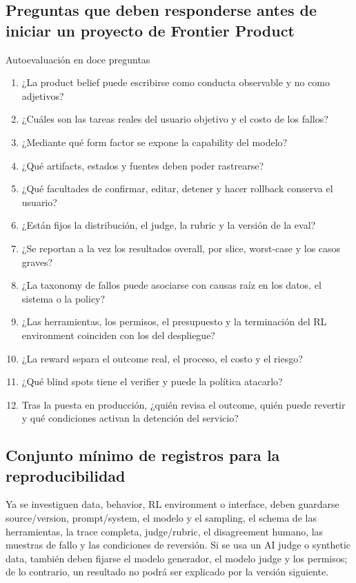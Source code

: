 \subsection{Preguntas que deben responderse antes de iniciar un proyecto de Frontier Product}

\begin{importantbox}{Autoevaluación en doce preguntas}
\begin{enumerate}
  \item ¿La product belief puede escribirse como conducta observable y no como adjetivos?
  \item ¿Cuáles son las tareas reales del usuario objetivo y el costo de los fallos?
  \item ¿Mediante qué form factor se expone la capability del modelo?
  \item ¿Qué artifacts, estados y fuentes deben poder rastrearse?
  \item ¿Qué facultades de confirmar, editar, detener y hacer rollback conserva el usuario?
  \item ¿Están fijos la distribución, el judge, la rubric y la versión de la eval?
  \item ¿Se reportan a la vez los resultados overall, por slice, worst-case y los casos graves?
  \item ¿La taxonomy de fallos puede asociarse con causas raíz en los datos, el sistema o la policy?
  \item ¿Las herramientas, los permisos, el presupuesto y la terminación del RL environment coinciden con los del despliegue?
  \item ¿La reward separa el outcome real, el proceso, el costo y el riesgo?
  \item ¿Qué blind spots tiene el verifier y puede la política atacarlo?
  \item Tras la puesta en producción, ¿quién revisa el outcome, quién puede revertir y qué condiciones activan la detención del servicio?
\end{enumerate}
\end{importantbox}

\subsection{Conjunto mínimo de registros para la reproducibilidad}

Ya se investiguen data, behavior, RL environment o interface, deben guardarse source/version, prompt/system, el modelo y el sampling, el schema de las herramientas, la trace completa, judge/rubric, el disagreement humano, las muestras de fallo y las condiciones de reversión. Si se usa un AI judge o synthetic data, también deben fijarse el modelo generador, el modelo judge y los permisos; de lo contrario, un resultado no podrá ser explicado por la versión siguiente.

